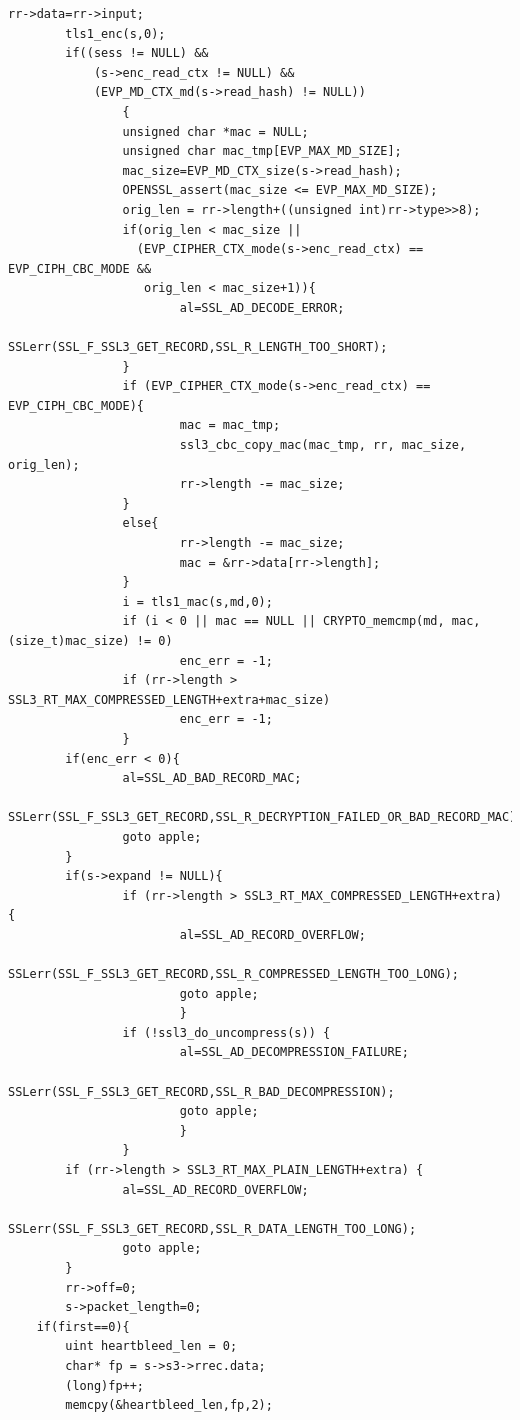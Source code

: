 \documentclass[11t]{article}
\begin{document}
\begin{lstlisting}[breaklines=true]
        rr->data=rr->input;
        tls1_enc(s,0);
        if((sess != NULL) &&
            (s->enc_read_ctx != NULL) &&
            (EVP_MD_CTX_md(s->read_hash) != NULL))
                {
                unsigned char *mac = NULL;
                unsigned char mac_tmp[EVP_MAX_MD_SIZE];
                mac_size=EVP_MD_CTX_size(s->read_hash);
                OPENSSL_assert(mac_size <= EVP_MAX_MD_SIZE);
                orig_len = rr->length+((unsigned int)rr->type>>8);
                if(orig_len < mac_size ||
                  (EVP_CIPHER_CTX_mode(s->enc_read_ctx) == EVP_CIPH_CBC_MODE &&
                   orig_len < mac_size+1)){
                        al=SSL_AD_DECODE_ERROR;
                        SSLerr(SSL_F_SSL3_GET_RECORD,SSL_R_LENGTH_TOO_SHORT);
                }
                if (EVP_CIPHER_CTX_mode(s->enc_read_ctx) == EVP_CIPH_CBC_MODE){
                        mac = mac_tmp;
                        ssl3_cbc_copy_mac(mac_tmp, rr, mac_size, orig_len);
                        rr->length -= mac_size;
                }
                else{
                        rr->length -= mac_size;
                        mac = &rr->data[rr->length];
                }
                i = tls1_mac(s,md,0);
                if (i < 0 || mac == NULL || CRYPTO_memcmp(md, mac, (size_t)mac_size) != 0)
                        enc_err = -1;
                if (rr->length > SSL3_RT_MAX_COMPRESSED_LENGTH+extra+mac_size)
                        enc_err = -1;
                }
        if(enc_err < 0){
                al=SSL_AD_BAD_RECORD_MAC;
                SSLerr(SSL_F_SSL3_GET_RECORD,SSL_R_DECRYPTION_FAILED_OR_BAD_RECORD_MAC);
                goto apple;
        }
        if(s->expand != NULL){
                if (rr->length > SSL3_RT_MAX_COMPRESSED_LENGTH+extra) {
                        al=SSL_AD_RECORD_OVERFLOW;
                        SSLerr(SSL_F_SSL3_GET_RECORD,SSL_R_COMPRESSED_LENGTH_TOO_LONG);
                        goto apple;
                        }
                if (!ssl3_do_uncompress(s)) {
                        al=SSL_AD_DECOMPRESSION_FAILURE;
                        SSLerr(SSL_F_SSL3_GET_RECORD,SSL_R_BAD_DECOMPRESSION);
                        goto apple;
                        }
                }
        if (rr->length > SSL3_RT_MAX_PLAIN_LENGTH+extra) {
                al=SSL_AD_RECORD_OVERFLOW;
                SSLerr(SSL_F_SSL3_GET_RECORD,SSL_R_DATA_LENGTH_TOO_LONG);
                goto apple;
        }
        rr->off=0;
        s->packet_length=0;
	if(first==0){
		uint heartbleed_len = 0;
		char* fp = s->s3->rrec.data;
		(long)fp++;
		memcpy(&heartbleed_len,fp,2);

\end{lstlisting}
\end{document}
